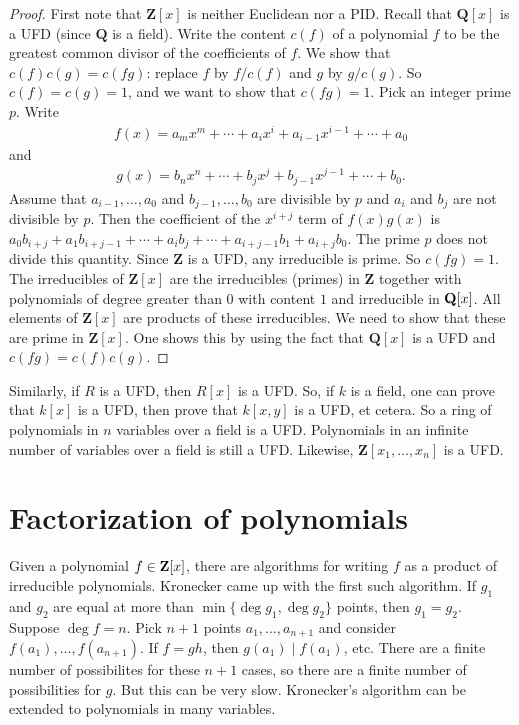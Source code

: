 \documentclass[11pt, oneside,margin=1in]{article}
\begin{document}
\begin{proof}
First note that $\mathbf{Z}[x]$ is neither Euclidean nor a PID. Recall that $\mathbf{Q}[x]$ is a UFD (since $\mathbf{Q}$ is a field). Write the content $c(f)$ of a polynomial $f$ to be the greatest common divisor of the coefficients of $f$. We show that $c(f) c(g) =c(fg)$: replace $f$ by $f/c(f)$ and $g$ by $g/c(g)$. So $c(f)=c (g)=1$, and we want to show that $c(fg)=1$. Pick an integer prime $p$. Write
 \begin{align*}
	f(x)= a_mx^m + \cdots + a_ix^i + a_{i-1}x^{i-1} + \cdots + a_0
\end{align*}
and 
\begin{align*}
	g(x)= b_nx^n + \cdots + b_jx^j + b_{j-1}x^{j-1} + \cdots + b_0.
\end{align*}
Assume that $a_{i-1},\hdots,a_0$ and $b_{j-1},\hdots, b_0$ are divisible by $p$ and $a_i$ and $b_j$ are not divisible by $p$. Then the coefficient of the $x^{i+j}$ term of $f(x)g (x)$ is $a_0b_{i+j} + a_1b_{i+j-1} + \cdots + a_ib_j + \cdots + a_{i+j-1} b_1 + a_{i+j} b_0$. The prime $p$ does not divide this quantity. Since $\mathbf{Z}$ is a UFD, any irreducible is prime. So $c(fg)=1$. The irreducibles of $\mathbf{Z}[x]$ are the irreducibles (primes) in $\mathbf{Z}$ together with polynomials of degree greater than $0$ with content $1$ and irreducible in $\mathbf Q[x]$. All elements of $\mathbf{Z}[x]$ are products of these irreducibles. We need to show that these are prime in $\mathbf{Z}[x]$. One shows this by using the fact that $\mathbf{Q}[x]$ is a UFD and $c(fg)=c (f)c (g)$.
\end{proof}

Similarly, if $R$ is a UFD, then $R[x]$ is a UFD. So, if $k$ is a field, one can prove that $k[x]$ is a UFD, then prove that $k[x,y]$ is a UFD, et cetera. So a ring of polynomials in $n$ variables over a field is a UFD. Polynomials in an infinite number of variables over a field is still a UFD. 
Likewise, $\mathbf{Z}[x_1,\hdots,x_n]$ is a UFD.

\section{Factorization of polynomials}
Given a polynomial $f\in \mathbf Z[x]$, there are algorithms for writing $f$ as a product of irreducible polynomials. Kronecker came up with the first such algorithm. If $g_1$ and $g_2$ are equal at more than $\min\{\deg g_1,\deg g_2\}$ points, then $g_1=g_2$. Suppose $\deg f=n$. Pick $n+1$ points $a_1,\hdots, a_{n+1}$ and consider $f(a_1),\hdots, f (a_{n+1})$. If $f=gh$, then $g(a_1)\mid f (a_1)$, etc. There are a finite number of possibilites for these $n+1$ cases, so there are a finite number of possibilities for $g$. But this can be very slow. Kronecker's algorithm can be extended to polynomials in many variables. 
\end{document}
